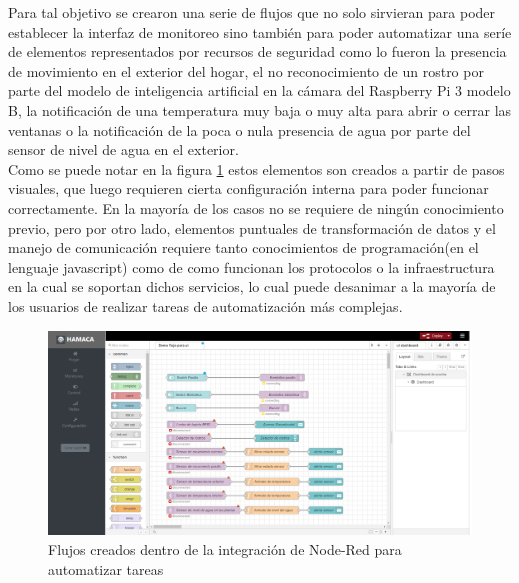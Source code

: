 Para tal objetivo se crearon una serie de flujos que no solo sirvieran para poder establecer la interfaz de monitoreo sino también para poder automatizar una seríe de elementos representados por recursos de seguridad como lo fueron la presencia de movimiento en el exterior del hogar, el no reconocimiento de un rostro por parte del modelo de inteligencia artificial en la cámara del Raspberry Pi 3 modelo B, la notificación de una temperatura muy baja o muy alta para abrir o cerrar las ventanas o la notificación de la poca o nula presencia de agua por parte del sensor de nivel de agua en el exterior.\\

Como se puede notar en la figura \ref{fig:hamaca_nodered} estos elementos son creados a partir de pasos visuales, que luego requieren cierta configuración interna para poder funcionar correctamente. En la mayoría de los casos no se requiere de ningún conocimiento previo, pero por otro lado, elementos puntuales de transformación de datos y el manejo de comunicación requiere tanto conocimientos de programación(en el lenguaje javascript) como de como funcionan los protocolos o la infraestructura en la cual se soportan dichos servicios, lo cual puede desanimar a la mayoría de los usuarios de realizar tareas de automatización más complejas.
\begin{figure}[htb]
\centering
\includegraphics[scale=0.225]{./Figuras/hamaca_nodered.png}
\caption{Flujos creados dentro de la integración de Node-Red para automatizar tareas}
\label{fig:hamaca_nodered}
\vspace*{-10pt}
\end{figure}